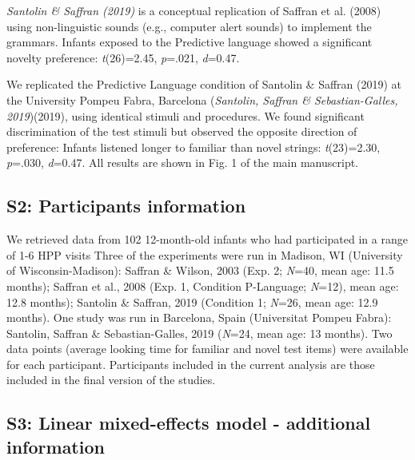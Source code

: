 \documentclass[english,man,man,floatsintext]{apa6}
\begin{document}
\begin{appendix}
\emph{Santolin \& Saffran (2019)} is a conceptual replication of Saffran
et al. (2008) using non-linguistic sounds (e.g., computer alert sounds)
to implement the grammars. Infants exposed to the Predictive language
showed a significant novelty preference: \emph{t}(26)=2.45,
\emph{p}=.021, \emph{d}=0.47.

We replicated the Predictive Language condition of Santolin \& Saffran
(2019) at the University Pompeu Fabra, Barcelona (\emph{Santolin,
Saffran \& Sebastian-Galles, 2019})(2019), using identical stimuli and
procedures. We found significant discrimination of the test stimuli but
observed the opposite direction of preference: Infants listened longer
to familiar than novel strings: \emph{t}(23)=2.30, \emph{p}=.030,
\emph{d}=0.47. All results are shown in Fig. 1 of the main manuscript.

\hypertarget{s2-participants-information}{%
\subsection{S2: Participants
information}\label{s2-participants-information}}

We retrieved data from 102 12-month-old infants who had participated in
a range of 1-6 HPP visits Three of the experiments were run in Madison,
WI (University of Wisconsin-Madison): Saffran \& Wilson, 2003 (Exp. 2;
\emph{N}=40, mean age: 11.5 months); Saffran et al., 2008 (Exp. 1,
Condition P-Language; \emph{N}=12), mean age: 12.8 months); Santolin \&
Saffran, 2019 (Condition 1; \emph{N}=26, mean age: 12.9 months). One
study was run in Barcelona, Spain (Universitat Pompeu Fabra): Santolin,
Saffran \& Sebastian-Galles, 2019 (\emph{N}=24, mean age: 13 months).
Two data points (average looking time for familiar and novel test items)
were available for each participant. Participants included in the
current analysis are those included in the final version of the studies.

\hypertarget{s3-linear-mixed-effects-model---additional-information}{%
\subsection{S3: Linear mixed-effects model - additional
information}\label{s3-linear-mixed-effects-model---additional-information}}


\end{appendix}
\end{document}
